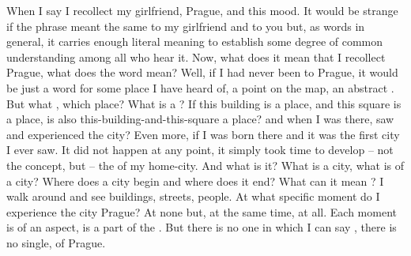 \pa\label{Prague} When I say  I
recollect my girlfriend, Prague, and this mood.  It would be strange if the
phrase meant the same to my girlfriend and to you but, as words in general, it
carries enough literal meaning to establish some degree of common understanding among
all who hear it.  Now, what does it mean that I recollect Prague, what does the
word  mean? Well, if I had never been to Prague, it would be just a
word for some place I have heard of, a point on the map, an abstract
. But what , which place? What is a ? If this
building is a place, and this square is a place, is also
this-building-and-this-square a place? and when I was there, saw and experienced
the city? Even more, if I was born there and it was the first city I ever saw.
It did not happen at any point, it simply took time to develop -- not the
concept, but -- the  of my home-city. And what is it? What is a
city, what is  of a city?  Where does a city begin and where
does it end?  What can it mean ? I walk around and see
buildings, streets, people. At what specific moment do I experience the city
Prague? At none but, at the same time, at all. Each moment is 
of an aspect, is a part of the . But there is no one in which
I can say , there is no single,
 of Prague.

